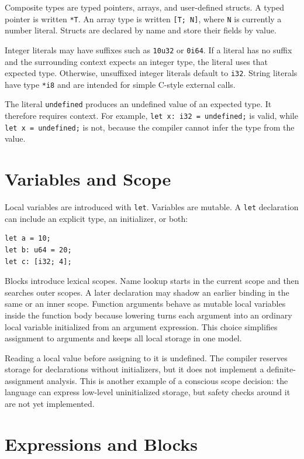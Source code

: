 Composite types are typed pointers, arrays, and user-defined structs. A typed
pointer is written \texttt{*T}. An array type is written \texttt{[T; N]}, where
\texttt{N} is currently a number literal. Structs are declared by name and store
their fields by value.

Integer literals may have suffixes such as \texttt{10u32} or \texttt{0i64}. If a
literal has no suffix and the surrounding context expects an integer type, the
literal uses that expected type. Otherwise, unsuffixed integer literals default
to \texttt{i32}. String literals have type \texttt{*i8} and are intended for
simple C-style external calls.

The literal \texttt{undefined} produces an undefined value of an expected type.
It therefore requires context. For example, \texttt{let x: i32 = undefined;} is
valid, while \texttt{let x = undefined;} is not, because the compiler cannot
infer the type from the value.

\section{Variables and Scope}

Local variables are introduced with \texttt{let}. Variables are mutable. A
\texttt{let} declaration can include an explicit type, an initializer, or both:

\begin{lstlisting}[language=EPL,caption={Variable declaration forms}]
let a = 10;
let b: u64 = 20;
let c: [i32; 4];
\end{lstlisting}

Blocks introduce lexical scopes. Name lookup starts in the current scope and
then searches outer scopes. A later declaration may shadow an earlier binding in
the same or an inner scope. Function arguments behave as mutable local variables
inside the function body because lowering turns each argument into an ordinary
local variable initialized from an argument expression. This choice simplifies
assignment to arguments and keeps all local storage in one model.

Reading a local value before assigning to it is undefined. The compiler reserves
storage for declarations without initializers, but it does not implement a
definite-assignment analysis. This is another example of a conscious scope
decision: the language can express low-level uninitialized storage, but safety
checks around it are not yet implemented.

\section{Expressions and Blocks}

